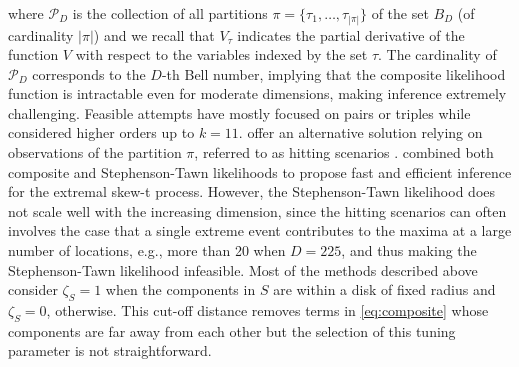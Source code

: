\documentclass[12pt]{article}
\begin{document}
where $\mathcal P_D$ is the collection of all partitions $\pi=\{\tau_1,\ldots,\tau_{|\pi|}\}$ of the set $B_D$ (of cardinality $|\pi|$) and we recall that $V_\tau$ indicates the partial derivative of the function $V$ with respect to the variables indexed by the set $\tau$. The cardinality of $\mathcal P_D$ corresponds to the $D$-th Bell number, implying that the composite likelihood function is intractable even for moderate dimensions, making inference extremely challenging. Feasible attempts have mostly focused on pairs or triples \citep{Padoan.etal:2010, Huser.Davison:2013a} while \citet{Castruccio.etal:2016} considered higher orders up to $k=11$. \citet{Stephenson.Tawn:2005} offer an alternative solution relying on observations of the partition $\pi$, referred to as hitting scenarios \citep[see also][]{Wadsworth.Tawn:2014}. \citet{Beranger.etal:2021} combined both composite and Stephenson-Tawn likelihoods to propose fast and efficient inference for the extremal skew-t process. However, the Stephenson-Tawn likelihood does not scale well with the increasing dimension, since the hitting scenarios can often involves the case that a single extreme event contributes to the maxima at a large number of locations, e.g., more than 20 when $D=225$, and thus making the Stephenson-Tawn likelihood infeasible. Most of the methods described above consider $\zeta_S=1$ when the components in $S$ are within a disk of fixed radius and $\zeta_S=0$, otherwise. This cut-off distance removes terms in \eqref{eq:composite} whose components are far away from each other but the selection of this tuning parameter is not straightforward. 
\end{document}

